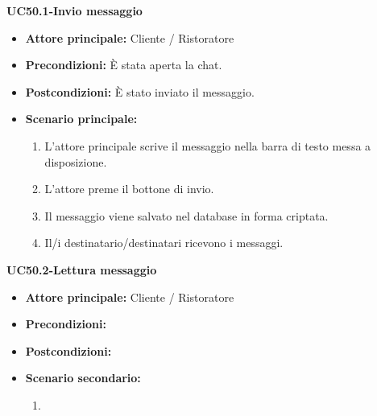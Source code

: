 \textbf{UC50.1-Invio messaggio}
\begin{itemize}
\item \textbf{Attore principale:} Cliente / Ristoratore
\item \textbf{Precondizioni:} È stata aperta la chat.
\item \textbf{Postcondizioni:} È stato inviato il messaggio.
\item \textbf{Scenario principale:}
\begin{enumerate}
    \item L'attore principale scrive il messaggio nella barra di testo messa a disposizione.
    \item L'attore preme il bottone di invio.
    \item Il messaggio viene salvato nel database in forma criptata.
    \item Il/i destinatario/destinatari ricevono i messaggi.
\end{enumerate}
\end{itemize}

\textbf{UC50.2-Lettura messaggio}
\begin{itemize}
\item \textbf{Attore principale:} Cliente / Ristoratore
\item \textbf{Precondizioni:}
\item \textbf{Postcondizioni:}
\item \textbf{Scenario secondario:}
\begin{enumerate}
    \item
\end{enumerate}
\end{itemize}
